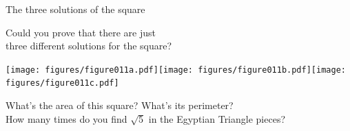 \documentclass[14pt]{beamer}
\begin{document}



    \begin{frame}{The three solutions of the square}

        \vspace{-1em}
        \begin{center}
            Could you prove that there are just\\three different solutions for the square?

            \bigskip\bigskip

            \texttt{[image: figures/figure011a.pdf]}\quad\texttt{[image: figures/figure011b.pdf]}\quad\texttt{[image: figures/figure011c.pdf]} \\

            \bigskip\bigskip

            {\footnotesize What's the area of this square? What's its perimeter?\\How many times do you find $\sqrt{5}$ in the Egyptian Triangle pieces?}
        \end{center}
    \end{frame}

\end{document}
